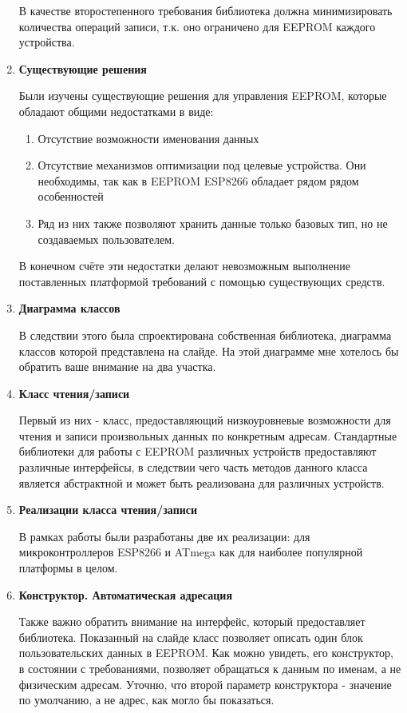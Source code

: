 \documentclass[14pt]{extarticle}
\begin{document}
\begin{enumerate}
	В качестве второстепенного требования библиотека должна минимизировать количества операций записи, т.к. оно ограничено для EEPROM каждого устройства.

	\item \textbf{Существующие решения}

	Были изучены существующие решения для управления EEPROM, которые обладают общими недостатками в виде:
	\begin{enumerate}
		\item Отсутствие возможности именования данных
		\item Отсутствие механизмов оптимизации под целевые устройства. Они необходимы, так как в EEPROM ESP8266 обладает рядом рядом особенностей
		\item Ряд из них также позволяют хранить данные только базовых тип, но не создаваемых пользователем.
	\end{enumerate}

	В конечном счёте эти недостатки делают невозможным выполнение поставленных платформой требований с помощью существующих средств.

	\item \textbf{Диаграмма классов}

	В следствии этого была спроектирована собственная библиотека, диаграмма классов которой представлена на слайде.
	На этой диаграмме мне хотелось бы обратить ваше внимание на два участка.

	\item \textbf{Класс чтения/записи}

	Первый из них - класс, предоставляющий низкоуровневые возможности для чтения и записи произвольных данных по конкретным адресам.
	Стандартные библиотеки для работы с EEPROM различных устройств предоставляют различные интерфейсы, в следствии чего часть методов данного класса является абстрактной и может быть реализована для различных устройств.

	\item \textbf{Реализации класса чтения/записи}

	В рамках работы были разработаны две их реализации: для микроконтроллеров ESP8266 и ATmega как для наиболее популярной платформы в целом.

	\item \textbf{Конструктор. Автоматическая адресация}

	Также важно обратить внимание на интерфейс, который предоставляет библиотека.
	Показанный на слайде класс позволяет описать один блок пользовательских данных в EEPROM.
	Как можно увидеть, его конструктор, в состоянии с требованиями, позволяет обращаться к данным по именам, а не физическим адресам.
	Уточню, что второй параметр конструктора - значение по умолчанию, а не адрес, как могло бы показаться.


\end{enumerate}
\end{document}
